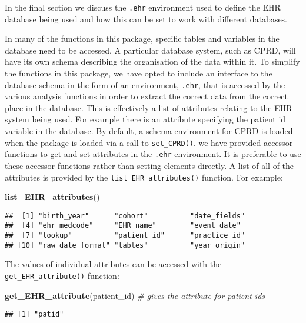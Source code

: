\documentclass[]{article}
\newenvironment{Shaded}{\begin{snugshade}}{\end{snugshade}}
\newcommand{\KeywordTok}[1]{\textcolor[rgb]{0.13,0.29,0.53}{\textbf{{#1}}}}
\newcommand{\CommentTok}[1]{\textcolor[rgb]{0.56,0.35,0.01}{\textit{{#1}}}}
\newcommand{\NormalTok}[1]{{#1}}
\begin{document}
In the final section we discuss the \texttt{.ehr} environment used to
define the EHR database being used and how this can be set to work with
different databases.

In many of the functions in this package, specific tables and variables
in the database need to be accessed. A particular database system, such
as CPRD, will have its own schema describing the organisation of the
data within it. To simplify the functions in this package, we have opted
to include an interface to the database schema in the form of an
environment, \texttt{.ehr}, that is accessed by the various analysis
functions in order to extract the correct data from the correct place in
the database. This is effectively a list of attributes relating to the
EHR system being used. For example there is an attribute specifying the
patient id variable in the database. By default, a schema environment
for CPRD is loaded when the package is loaded via a call to
\texttt{set\_CPRD()}. we have provided accessor functions to get and set
attributes in the \texttt{.ehr} environment. It is preferable to use
these accessor functions rather than setting elements directly. A list
of all of the attributes is provided by the
\texttt{list\_EHR\_attributes()} function. For example:

\begin{Shaded}
\begin{Highlighting}[]
\KeywordTok{list_EHR_attributes}\NormalTok{()}
\end{Highlighting}
\end{Shaded}

\begin{verbatim}
##  [1] "birth_year"      "cohort"          "date_fields"    
##  [4] "ehr_medcode"     "EHR_name"        "event_date"     
##  [7] "lookup"          "patient_id"      "practice_id"    
## [10] "raw_date_format" "tables"          "year_origin"
\end{verbatim}

The values of individual attributes can be accessed with the
\texttt{get\_EHR\_attribute()} function:

\begin{Shaded}
\begin{Highlighting}[]
\KeywordTok{get_EHR_attribute}\NormalTok{(patient_id) }\CommentTok{# gives the attribute for patient ids}
\end{Highlighting}
\end{Shaded}

\begin{verbatim}
## [1] "patid"
\end{verbatim}
\end{document}
